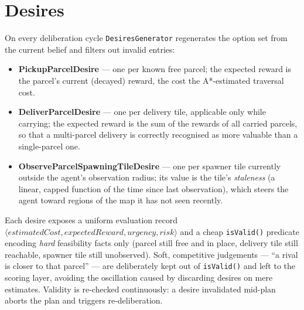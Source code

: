 \section{Desires}
\label{sec:desires}

On every deliberation cycle \texttt{DesiresGenerator} regenerates the option set from the
current belief and filters out invalid entries:

\begin{itemize}
    \item \textbf{PickupParcelDesire} --- one per known free parcel; the expected reward is the
    parcel's current (decayed) reward, the cost the A*-estimated traversal cost.
    \item \textbf{DeliverParcelDesire} --- one per delivery tile, applicable only while carrying;
    the expected reward is the sum of the rewards of all carried parcels, so that a multi-parcel
    delivery is correctly recognised as more valuable than a single-parcel one.
    \item \textbf{ObserveParcelSpawningTileDesire} --- one per spawner tile currently outside the
    agent's observation radius; its value is the tile's \emph{staleness} (a linear, capped
    function of the time since last observation), which steers the agent toward regions of the
    map it has not seen recently.
\end{itemize}

Each desire exposes a uniform evaluation record
$\langle \mathit{estimatedCost}, \mathit{expectedReward}, \mathit{urgency}, \mathit{risk} \rangle$
and a cheap \texttt{isValid()} predicate encoding \emph{hard} feasibility facts only (parcel
still free and in place, delivery tile still reachable, spawner tile still unobserved). Soft,
competitive judgements --- ``a rival is closer to that parcel'' --- are deliberately kept out of
\texttt{isValid()} and left to the scoring layer, avoiding the oscillation caused by discarding
desires on mere estimates. Validity is re-checked continuously: a desire invalidated mid-plan
aborts the plan and triggers re-deliberation.
